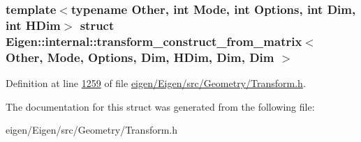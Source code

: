 \subsubsection*{template$<$typename Other, int Mode, int Options, int Dim, int H\+Dim$>$\newline
struct Eigen\+::internal\+::transform\+\_\+construct\+\_\+from\+\_\+matrix$<$ Other, Mode, Options, Dim, H\+Dim, Dim, Dim $>$}



Definition at line \hyperlink{eigen_2_eigen_2src_2_geometry_2_transform_8h_source_l01259}{1259} of file \hyperlink{eigen_2_eigen_2src_2_geometry_2_transform_8h_source}{eigen/\+Eigen/src/\+Geometry/\+Transform.\+h}.



The documentation for this struct was generated from the following file\+:\begin{DoxyCompactItemize}
\item 
eigen/\+Eigen/src/\+Geometry/\+Transform.\+h\end{DoxyCompactItemize}
